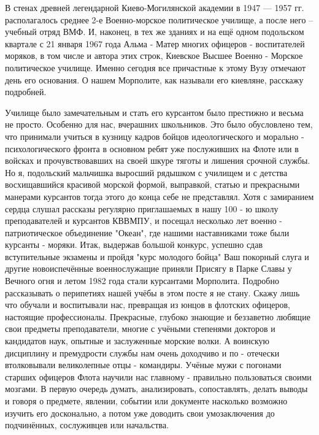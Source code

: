\raggedcolumns
\begin{multicols}{2} %
\setlength{\parindent}{0pt}


\end{multicols} %

В стенах древней легендарной Киево-Могилянской академии в 1947 — 1957 гг.
располагалось среднее 2-е Военно-морское политическое училище, а после него –
учебный отряд ВМФ. И, наконец, в тех же зданиях и на ещё одном подольском
квартале с 21 января 1967 года Альма - Матер многих офицеров - воспитателей
моряков, в том числе и автора этих строк, Киевское Высшее Военно - Морское
политическое училище. Именно сегодня все причастные к этому Вузу отмечают день
его основания. О нашем Морполите, как называли его киевляне, расскажу
подробней.

Училище было замечательным и стать его курсантом было престижно и весьма не
просто. Особенно для нас, вчерашних школьников. Это было обусловлено тем, что
принимали учиться в кузницу кадров бойцов идеологического и морально -
психологического фронта в основном ребят уже послуживших на Флоте или в войсках
и прочувствовавших на своей шкуре тяготы и лишения срочной службы. Но я,
подольский мальчишка выросший рядышком с училищем и с детства восхищавшийся
красивой морской формой, выправкой, статью и прекрасными манерами курсантов
тогда этого до конца себе не представлял. Хотя с замиранием сердца слушал
рассказы регулярно приглашаемых в нашу 100 - ю школу преподавателей и курсантов
КВВМПУ, и посещал несколько лет военно - патриотическое объединение "Океан",
где нашими наставниками тоже были курсанты - моряки. Итак, выдержав большой
конкурс, успешно сдав вступительные экзамены и пройдя "курс молодого бойца" Ваш
покорный слуга и другие новоиспечённые военнослужащие приняли Присягу в Парке
Славы у Вечного огня и летом 1982 года стали курсантами Морполита. Подробно
рассказывать о перипетиях нашей учёбы в этом посте я не стану. Скажу лишь что
обучали и воспитывали нас, превращая из юнцов в флотских офицеров, настоящие
профессионалы. Прекрасные, глубоко знающие и беззаветно любящие свои предметы
преподаватели, многие с учёными степенями докторов и кандидатов наук, опытные и
заслуженные морские волки. А воинскую дисциплину и премудрости службы нам очень
доходчиво и по - отечески втолковывали великолепные отцы - командиры. Учёные
мужи с погонами старших офицеров Флота научили нас главному - правильно
пользоваться своими мозгами. В первую очередь думать, анализировать,
сопоставлять, делать выводы и говоря о предмете, явлении, событии или документе
насколько возможно изучить его досконально, а потом уже доводить свои
умозаключения до подчинённых, сослуживцев или начальства. 

